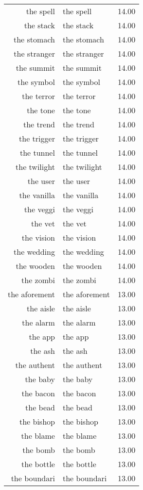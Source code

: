 \begin{table}[ht]
\begin{tabular}{rlr}
  the spell & the spell & 14.00 \\ 
  the stack & the stack & 14.00 \\ 
  the stomach & the stomach & 14.00 \\ 
  the stranger & the stranger & 14.00 \\ 
  the summit & the summit & 14.00 \\ 
  the symbol & the symbol & 14.00 \\ 
  the terror & the terror & 14.00 \\ 
  the tone & the tone & 14.00 \\ 
  the trend & the trend & 14.00 \\ 
  the trigger & the trigger & 14.00 \\ 
  the tunnel & the tunnel & 14.00 \\ 
  the twilight & the twilight & 14.00 \\ 
  the user & the user & 14.00 \\ 
  the vanilla & the vanilla & 14.00 \\ 
  the veggi & the veggi & 14.00 \\ 
  the vet & the vet & 14.00 \\ 
  the vision & the vision & 14.00 \\ 
  the wedding & the wedding & 14.00 \\ 
  the wooden & the wooden & 14.00 \\ 
  the zombi & the zombi & 14.00 \\ 
  the aforement & the aforement & 13.00 \\ 
  the aisle & the aisle & 13.00 \\ 
  the alarm & the alarm & 13.00 \\ 
  the app & the app & 13.00 \\ 
  the ash & the ash & 13.00 \\ 
  the authent & the authent & 13.00 \\ 
  the baby & the baby & 13.00 \\ 
  the bacon & the bacon & 13.00 \\ 
  the bead & the bead & 13.00 \\ 
  the bishop & the bishop & 13.00 \\ 
  the blame & the blame & 13.00 \\ 
  the bomb & the bomb & 13.00 \\ 
  the bottle & the bottle & 13.00 \\ 
  the boundari & the boundari & 13.00 \\ 

\end{tabular}
\end{table}
